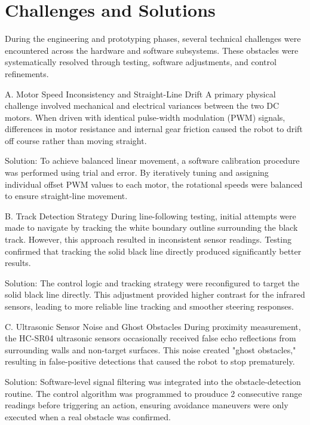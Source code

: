 \section{Challenges and Solutions}
\label{sec:challenges_solutions}
During the engineering and prototyping phases, several technical challenges were encountered across the hardware and software subsystems. 
These obstacles were systematically resolved through testing, software adjustments, and control refinements.  

A. Motor Speed Inconsistency and Straight-Line Drift
A primary physical challenge involved mechanical and electrical variances between the two DC motors. When driven with identical pulse-width modulation (PWM) signals, differences in motor resistance and internal gear friction caused the robot to drift off course rather than moving straight.  

Solution: To achieve balanced linear movement, a software calibration procedure was performed using trial and error. By iteratively tuning and assigning individual offset PWM values to each motor, the rotational speeds were balanced to ensure straight-line movement.

B. Track Detection Strategy
During line-following testing, initial attempts were made to navigate by tracking the white boundary outline surrounding the black track. However, this approach resulted in inconsistent sensor readings. Testing confirmed that tracking the solid black line directly produced significantly better results.

Solution: The control logic and tracking strategy were reconfigured to target the solid black line directly. This adjustment provided higher contrast for the infrared sensors, leading to more reliable line tracking 
and smoother steering responses.

C. Ultrasonic Sensor Noise and Ghost Obstacles
During proximity measurement, the HC-SR04 ultrasonic sensors occasionally received false echo reflections from surrounding walls and non-target surfaces. This noise created "ghost obstacles," resulting in false-positive detections that caused the robot to stop prematurely.

Solution: Software-level signal filtering was integrated into the obstacle-detection routine. The control algorithm was programmed to prouduce 2 consecutive range readings before triggering an action, ensuring avoidance maneuvers were only executed when a real obstacle was confirmed.
